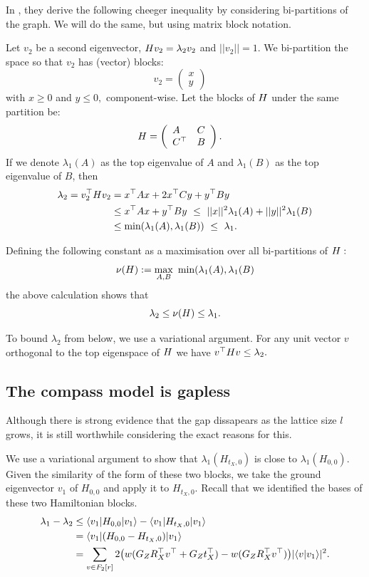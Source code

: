 \documentclass[12pt]{article}
\begin{document}
In \cite{Friedland2002}, they derive the following cheeger inequality
by considering bi-partitions of the graph. We will do the
same, but using matrix block notation.

Let $v_2$ be a second eigenvector, $ H v_2 = \lambda_2 v_2 $ 
and $||v_2||=1$.
We bi-partition the space 
so that $v_2$ has (vector) blocks:
$$
v_2 = \left( \begin{array}{l}
x\\
y\end{array} \right)\quad
$$
with $x\ge 0$ and $y\le 0,$ component-wise.
Let the blocks of $H$ under the same partition be:
$$
H = \left( \begin{array}{ll}
A&C\\
C^\top&B\end{array} \right).\quad
$$
If we denote $\lambda_1(A)$ as the top eigenvalue of $A$ and
$\lambda_1(B)$ as the top eigenvalue of $B$,
then
\begin{align*}
\lambda_2 = v_2^\top H v_2 &= x^\top A x + 2 x^\top C y + y^\top B y \\
        &\le x^\top A x + y^\top B y\ \le\ ||x||^2 \lambda_1(A) + ||y||^2 \lambda_1(B) \\
        &\le \mbox{min}(\lambda_1(A), \lambda_1(B))\ \le\ \lambda_1.
\end{align*}

Defining the following constant as a maximisation over
all bi-partitions of $H:$
$$
    \nu(\Ham) := \max_{A, B}\ \mbox{min}(\lambda_1(A), \lambda_1(B)
$$
the above calculation shows that
$$
    \lambda_2 \le \nu(H) \le \lambda_1.
$$

To bound $\lambda_2$ from below, we use a variational argument.
For any unit vector $v$ orthogonal to the top eigenspace of $H$ we
have $v^\top H v \le \lambda_2.$


%

\subsection{The compass model is gapless}

Although there is strong evidence that the gap dissapears as the lattice size
$l$ grows, it is still worthwhile considering the exact reasons for this.

We use a variational argument to show that $\lambda_1(H_{t_X,0})$
is close to $\lambda_1(H_{0,0}).$
Given the similarity of the form of these two blocks, we
take the ground eigenvector $v_1$ of $H_{0,0}$ and apply it
to $H_{t_X,0}$. %
Recall that we identified the bases of these two Hamiltonian blocks.
\begin{align*}
    \lambda_1 - \lambda_2 &\le \langle{v_1}|H_{0,0}|{v_1}\rangle - \langle{v_1}|H_{t_X,0}|{v_1}\rangle  \\
            &= \langle{v_1}|(H_{0,0} - H_{t_X,0})|{v_1}\rangle  \\
    &= \sum_{v\in F_2[r]} 2\bigl(w(G_Z R_X^\top v^\top + G_Z t_X^\top) -w(G_Z R_X^\top v^\top)\bigr) 
    |\langle{v}|{v_1}\rangle|^2.
\end{align*}
\end{document}
